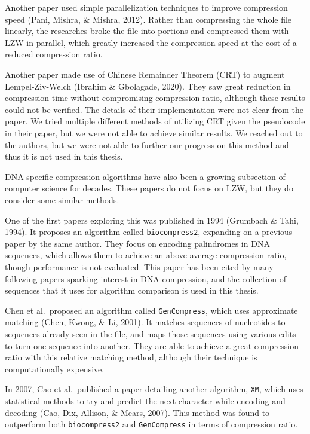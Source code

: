 \documentclass[12pt,twoside]{reedthesis}
\begin{document}
Another paper used simple parallelization techniques to improve compression speed (Pani, Mishra, \& Mishra, 2012). Rather than compressing the whole file linearly, the researches broke the file into portions and compressed them with LZW in parallel, which greatly increased the compression speed at the cost of a reduced compression ratio.

Another paper made use of Chinese Remainder Theorem (CRT) to augment Lempel-Ziv-Welch (Ibrahim \& Gbolagade, 2020). They saw great reduction in compression time without compromising compression ratio, although these results could not be verified. The details of their implementation were not clear from the paper. We tried multiple different methods of utilizing CRT given the pseudocode in their paper, but we were not able to achieve similar results. We reached out to the authors, but we were not able to further our progress on this method and thus it is not used in this thesis.

DNA-specific compression algorithms have also been a growing subsection of computer science for decades. These papers do not focus on LZW, but they do consider some similar methods.

One of the first papers exploring this was published in 1994 (Grumbach \& Tahi, 1994). It proposes an algorithm called \texttt{biocompress2}, expanding on a previous paper by the same author. They focus on encoding palindromes in DNA sequences, which allows them to achieve an above average compression ratio, though performance is not evaluated. This paper has been cited by many following papers sparking interest in DNA compression, and the collection of sequences that it uses for algorithm comparison is used in this thesis.

Chen et al.~proposed an algorithm called \texttt{GenCompress}, which uses approximate matching (Chen, Kwong, \& Li, 2001). It matches sequences of nucleotides to sequences already seen in the file, and maps those sequences using various edits to turn one sequence into another. They are able to achieve a great compression ratio with this relative matching method, although their technique is computationally expensive.

In 2007, Cao et al.~published a paper detailing another algorithm, \texttt{XM}, which uses statistical methods to try and predict the next character while encoding and decoding (Cao, Dix, Allison, \& Mears, 2007). This method was found to outperform both \texttt{biocompress2} and \texttt{GenCompress} in terms of compression ratio.
\end{document}
